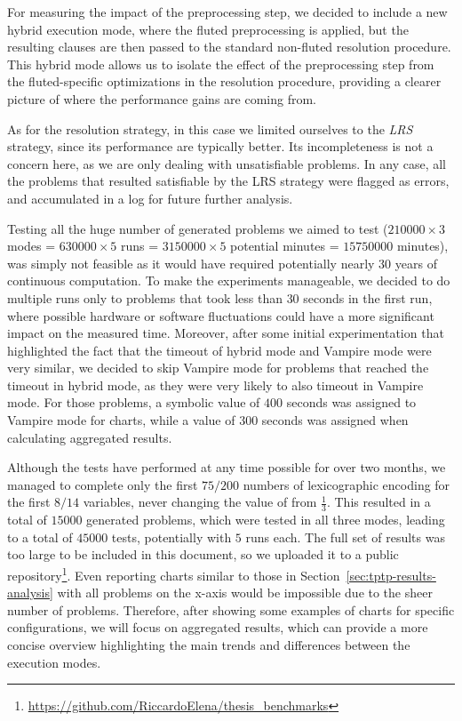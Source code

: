 For measuring the impact of the preprocessing step, we decided to include a new hybrid execution mode, where the fluted preprocessing is applied, but the resulting clauses are then passed to the standard non-fluted resolution procedure.
This hybrid mode allows us to isolate the effect of the preprocessing step from the fluted-specific optimizations in the resolution procedure, providing a clearer picture of where the performance gains are coming from.

As for the resolution strategy, in this case we limited ourselves to the \emph{LRS} strategy, since its performance are typically better. Its incompleteness is not a concern here, as we are only dealing with unsatisfiable problems.
In any case, all the problems that resulted satisfiable by the LRS strategy were flagged as errors, and accumulated in a log for future further analysis.

Testing all the huge number of generated problems we aimed to test (\(210000 \times 3\) modes = \(630000 \times 5\) runs = \(3150000 \times 5\) potential minutes = \(15750000\) minutes), was simply not feasible as it would have required potentially nearly 30 years of continuous computation.
To make the experiments manageable, we decided to do multiple runs only to problems that took less than \(30\) seconds in the first run, where possible hardware or software fluctuations could have a more significant impact on the measured time.
Moreover, after some initial experimentation that highlighted the fact that the timeout of hybrid mode and Vampire mode were very similar, we decided to skip Vampire mode for problems that reached the timeout in hybrid mode, as they were very likely to also timeout in Vampire mode.
For those problems, a symbolic value of \(400\) seconds was assigned to Vampire mode for charts, while a value of \(300\) seconds was assigned when calculating aggregated results.

Although the tests have performed at any time possible for over two months, we managed to complete only the first \(75/200\) numbers of lexicographic encoding for the first \(8/14\) variables, never changing the value of  from \(\frac{1}{3}\).
This resulted in a total of \(15000\) generated problems, which were tested in all three modes, leading to a total of \(45000\) tests, potentially with \(5\) runs each.
The full set of results was too large to be included in this document, so we uploaded it to a public repository\footnote{\url{https://github.com/RiccardoElena/thesis_benchmarks}}.
Even reporting charts similar to those in Section~\ref{sec:tptp-results-analysis} with all problems on the x-axis would be impossible due to the sheer number of problems.
Therefore, after showing some examples of charts for specific configurations, we will focus on aggregated results, which can provide a more concise overview highlighting the main trends and differences between the execution modes.

